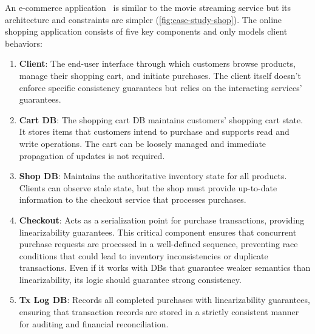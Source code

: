 %
%
An e-commerce application~\cite{gan2019an} is similar to the movie
streaming service but its architecture and constraints are simpler
(\cref{fig:case-study-shop}).
The online shopping application consists of five key components and only
models client behaviors:
\begin{enumerate}[leftmargin=*, noitemsep,topsep=0pt]
\item \textbf{Client}: The end-user interface through which
  customers browse products, manage their shopping cart, and
  initiate purchases. The client itself doesn't enforce specific
  consistency guarantees but relies on the interacting
  services' guarantees.
\item \textbf{Cart DB}: The shopping cart DB maintains customers'
  shopping cart state. It stores items that customers intend to
  purchase and supports read and write operations. The cart can be
  loosely managed and immediate propagation of updates is not required.
\item \textbf{Shop DB}:  Maintains the authoritative inventory state
  for all products. Clients can observe stale state, but the shop must provide
  up-to-date information to the checkout service that processes purchases.

\item \textbf{Checkout}: Acts as a serialization point for
  purchase transactions, providing linearizability guarantees. This
  critical component ensures that concurrent purchase requests are
  processed in a well-defined sequence, preventing race conditions
  that could lead to inventory inconsistencies or duplicate transactions.
  Even if it works with DBs that guarantee weaker semantics than
  linearizability,
  its logic should guarantee strong consistency.

\item \textbf{Tx Log DB}:  Records all completed purchases
  with linearizability guarantees, ensuring that transaction
  records are stored in a strictly consistent manner for auditing
  and financial reconciliation.
\end{enumerate}

